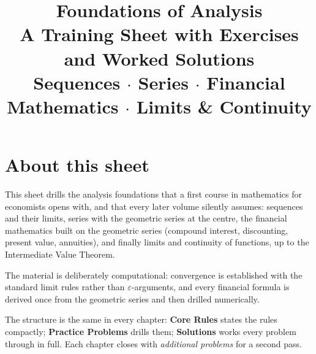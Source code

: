 \documentclass[10pt,oneside]{book}
\title{\Huge Foundations of Analysis\\[0.4em]
  \large A Training Sheet with Exercises and Worked Solutions\\[0.8em]
  \normalsize Sequences \(\cdot\) Series \(\cdot\) Financial Mathematics
  \(\cdot\) Limits \& Continuity}
\author{}
\date{}
\begin{document}
\frontmatter
\maketitle

\chapter*{About this sheet}

This sheet drills the analysis foundations that a first course in
mathematics for economists opens with, and that every later volume silently
assumes: sequences and their limits, series with the geometric series at
the centre, the financial mathematics built on the geometric series
(compound interest, discounting, present value, annuities), and finally
limits and continuity of functions, up to the Intermediate Value Theorem.

The material is deliberately computational: convergence is established with
the standard limit rules rather than $\varepsilon$-arguments, and every
financial formula is derived once from the geometric series and then
drilled numerically.

The structure is the same in every chapter: \textbf{Core Rules} states the
rules compactly; \textbf{Practice Problems} drills them; \textbf{Solutions}
works every problem through in full. Each chapter closes with
\emph{additional problems} for a second pass.

\tableofcontents

\mainmatter




\end{document}
